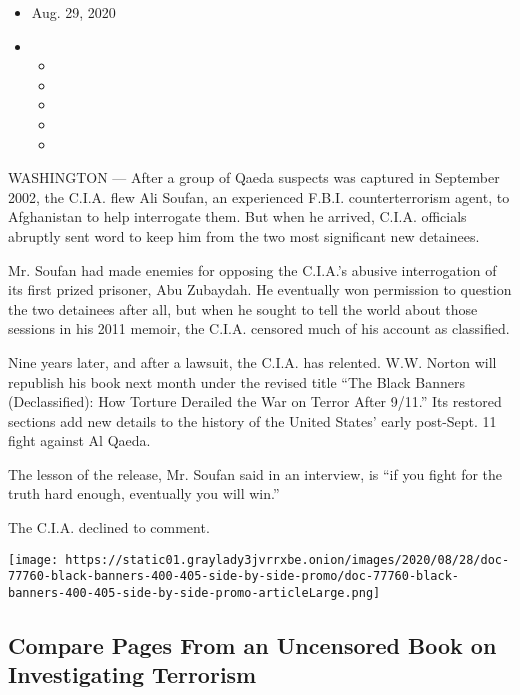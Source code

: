 \begin{itemize}
\item
  Aug. 29, 2020
\item
  \begin{itemize}
  \item
  \item
  \item
  \item
  \item
  \end{itemize}
\end{itemize}

WASHINGTON --- After a group of Qaeda suspects was captured in September
2002, the C.I.A. flew Ali Soufan, an experienced F.B.I. counterterrorism
agent, to Afghanistan to help interrogate them. But when he arrived,
C.I.A. officials abruptly sent word to keep him from the two most
significant new detainees.

Mr. Soufan had made enemies for opposing the C.I.A.'s abusive
interrogation of its first prized prisoner, Abu Zubaydah. He eventually
won permission to question the two detainees after all, but when he
sought to tell the world about those sessions in his 2011 memoir, the
C.I.A. censored much of his account as classified.

Nine years later, and after a lawsuit, the C.I.A. has relented. W.W.
Norton will republish his book next month under the revised title ``The
Black Banners (Declassified): How Torture Derailed the War on Terror
After 9/11.'' Its restored sections add new details to the history of
the United States' early post-Sept. 11 fight against Al Qaeda.

The lesson of the release, Mr. Soufan said in an interview, is ``if you
fight for the truth hard enough, eventually you will win.''

The C.I.A. declined to comment.

\href{https://www.nytimes3xbfgragh.onion/interactive/2020/08/29/us/black-banners-400-405-side-by-side.html}{}

\texttt{[image: https://static01.graylady3jvrrxbe.onion/images/2020/08/28/doc-77760-black-banners-400-405-side-by-side-promo/doc-77760-black-banners-400-405-side-by-side-promo-articleLarge.png]}

\hypertarget{compare-pages-from-an-uncensored-book-on-investigating-terrorism}{%
\subsection{Compare Pages From an Uncensored Book on Investigating
Terrorism}\label{compare-pages-from-an-uncensored-book-on-investigating-terrorism}}

